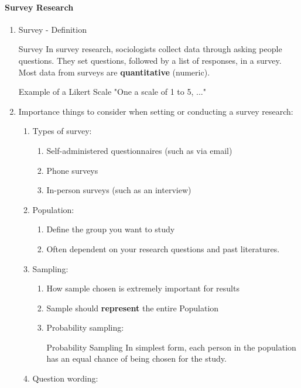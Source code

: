 \documentclass[12pt,a4paper]{article}
\begin{document}
\paragraph{Survey Research}
\begin{enumerate}
	\item Survey - Definition
	\begin{df}{Survey}
		In survey research, sociologists collect data through asking people questions. They set questions, followed by a list of responses, in a survey. Most data from surveys are \textbf{quantitative} (numeric). 
	\end{df}
	\begin{eg}{Example of a Likert Scale}
		"One a scale of 1 to 5, ..."
	\end{eg}
	\item Importance things to consider when setting or conducting a survey research: 
	\begin{enumerate}
		\item Types of survey: 
		\begin{enumerate}
			\item Self-administered questionnaires (such as via email)
			\item Phone surveys
			\item In-person surveys (such as an interview)
		\end{enumerate}
		\item Population: 
		\begin{enumerate}
			\item Define the group you want to study
			\item Often dependent on your research questions and past literatures. 
		\end{enumerate}
		\item Sampling: 
		\begin{enumerate}
			\item How sample chosen is extremely important for results
			\item Sample should \textbf{represent} the entire Population
			\item Probability sampling: 
			\begin{df}{Probability Sampling}
				In simplest form, each person in the population has an equal chance of being chosen for the study. 
			\end{df}
		\end{enumerate}
		\item Question wording: 
		\begin{enumerate}

\end{enumerate}
\end{enumerate}
\end{enumerate}
\end{document}
